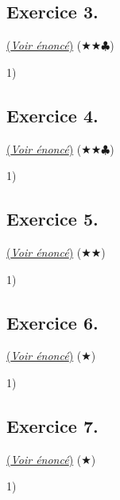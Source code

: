 \documentclass{article}
\newcommand{\0}{\emptyset}
\begin{document}
\subsection*{Exercice 3.}
\hyperref[subsec:ex3]{(\textit{Voir énoncé})} ($\bigstar\bigstar\clubsuit$)
\label{subsec:corr3}
\begin{flushleft}
1)\\
\end{flushleft}

\subsection*{Exercice 4.}
\hyperref[subsec:ex4]{(\textit{Voir énoncé})}
($\bigstar\bigstar\clubsuit$)
\label{subsec:corr4}
\begin{flushleft}
1)\\
\end{flushleft}

\subsection*{Exercice 5.}
\hyperref[subsec:ex5]{(\textit{Voir énoncé})}
($\bigstar\bigstar$)
\label{subsec:corr5}
\begin{flushleft}
1)\\
\end{flushleft}

\subsection*{Exercice 6.}
\hyperref[subsec:ex6]{(\textit{Voir énoncé})}
($\bigstar$)
\label{subsec:corr6}
\begin{flushleft}
1)\\
\end{flushleft}

\subsection*{Exercice 7.}
\hyperref[subsec:ex7]{(\textit{Voir énoncé})}
($\bigstar$)
\label{subsec:corr7}
\begin{flushleft}
1)\\
\end{flushleft}
\end{document}
